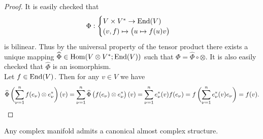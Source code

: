 \begin{proof}
It is easily checked that
\begin{equation*}
\Phi:\begin{cases} 
V \times V^* \to \End(V)\\
(v,f) \mapsto \del[1]{u \mapsto f(u)v}
\end{cases}
\end{equation*}
\noindent is bilinear. Thus by the universal property of the tensor product there exists a unique mapping $\widehat{\Phi} \in \operatorname{Hom}(V \otimes V^*; \operatorname{End}(V))$ such that $\Phi = \widehat{\Phi} \circ \otimes$. It is also easily checked that $\widehat{\Phi}$ is an isomorphism.\\
Let $f \in \operatorname{End}(V)$. Then for any $v \in V$ we have
\begin{equation*}
\widehat{\Phi}\del[3]{\sum_{\nu = 1}^n f(e_\nu) \otimes e_\nu^*}(v) = \sum_{\nu = 1}^n \widehat{\Phi}\del[1]{f(e_\nu) \otimes e_\nu^*}(v) = \sum_{\nu = 1}^n e_\nu^*(v)f(e_\nu) = f\del[3]{\sum_{\nu = 1}^n e_\nu^*(v)e_\nu} = f(v).
\end{equation*}
\end{proof}

\begin{proposition}
Any complex manifold admits a canonical almost complex structure.
\end{proposition}

